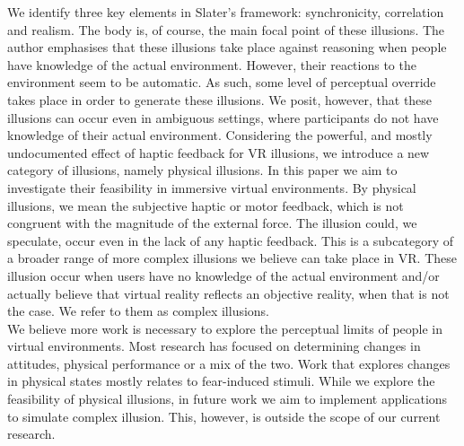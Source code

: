 We identify three key elements in Slater's framework: synchronicity, correlation and realism. The body is, of course, the main focal point of these illusions. The author emphasises that these illusions take place against reasoning when people have knowledge of the actual environment. However, their reactions to the environment seem to be automatic. As such, some level of perceptual override takes place in order to generate these illusions. We posit, however, that these illusions can occur even in ambiguous settings, where participants do not have knowledge of their actual environment. Considering the powerful, and mostly undocumented effect of haptic feedback for VR illusions, we introduce a new category of illusions, namely physical illusions. In this paper we aim to investigate their feasibility in immersive virtual environments. By physical illusions, we mean the subjective haptic or motor feedback, which is not congruent with the magnitude of the external force. The illusion could, we speculate, occur even in the lack of any haptic feedback. This is a subcategory of a broader range of more complex illusions we believe can take place in VR. These illusion occur when users have no knowledge of the actual environment and/or actually believe that virtual reality reflects an objective reality, when that is not the case. We refer to them as complex illusions. 
\\
We believe more work is necessary to explore the perceptual limits of people in virtual environments. Most research has focused on determining changes in attitudes, physical performance or a mix of the two. Work that explores changes in physical states mostly relates to fear-induced stimuli. While we explore the feasibility of physical illusions, in future work we aim to implement applications to simulate complex illusion. This, however, is outside the scope of our current research. 




